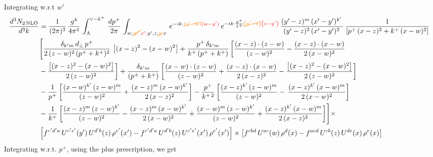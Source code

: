 \documentclass[9pt]{article}
\numberwithin{equation}{section}
\begin{document}
Integrating w.r.t $w'$
\begin{align}
 \frac{d^{3}N_{2\,\rm NLO}}{d^{3}k} & =  \frac{1}{(2\pi)^{3}}\,\frac{g^{4}}{4\pi^{4}}\,\int_{\Lambda}^{\vee-k^{+}}\, \frac{dp^{+}}{2\pi}\,\int_{w,{\color{orange}\cancel{w',}}{\color{red}x',}y',z,{\color{orange}\cancel{y,}}x}\, e^{-ik\cdot {\color{orange}\cancel{(y'-w)}}{\color{red}(w-y')}}\,e^{-ik\cdot \frac{p^{+}}{k^{+}}{\color{orange}\cancel{\left(y'-z\right)}}{\color{red}\left(z-y'\right)}}\, \frac{(y'-z)^{m}\,(x'-y')^{k'}\,}{(y'-z)^{2}\,(x'-y')^{2}\,}\, \frac{1}{\left[p^{+}\,(x-z)^{2}+k^{+}\,(x-w)^{2}\right]}\notag \\ & \Bigg[\frac{\delta_{k'm}\,d_{\perp}\,p^{+}}{2\,(z-w)^{2}\,(p^{+}+k^{+})^{2}}\, \left[(x-z)^{2}-(x-w)^{2}\right]+\frac{p^{+}\,\delta_{k'm}}{k^{+}\,(p^{+}+k^{+})}\,\bigg[\frac{(x-z)\cdot (z-w)}{(z-w)^{2}} -\frac{(x-z)\cdot (x-w)}{2\,(x-w)^{2}}\notag \\ & -\frac{\left[(x-z)^{2}-(x-w)^{2}\right]}{2\,(z-w)^{2}}\bigg] +\frac{\delta_{k'm}}{(p^{+}+k^{+})}\,\bigg[\frac{(x-w)\cdot (z-w)}{(z-w)^{2}}+\frac{(x-z)\cdot (x-w)}{2\,(x-z)^{2}} -\frac{\left[(x-z)^{2}-(x-w)^{2}\right]}{2\,(z-w)^{2}}\bigg]\notag \\ & -\frac{1}{p^{+}}\,\bigg[\frac{(x-w)^{k'}\,(z-w)^{m}}{(z-w)^{2}}+\frac{(x-z)^{m}\,(x-w)^{k'}}{2\,(x-z)^{2}}\bigg]-\frac{p^{+}}{k^{+\,2}}\,\bigg[\frac{(x-z)^{k'}\,(z-w)^{m}}{(z-w)^{2}} -\,\frac{(x-z)^{k'}\,(x-w)^{m}}{2\,(x-w)^{2}}\bigg]\notag \\ & -\frac{1}{k^{+}}\,\bigg[\frac{(x-z)^{m}\,(z-w)^{k'}}{(z-w)^{2}}-\frac{(x-z)^{m}\,(x-w)^{k'}}{2\,(x-w)^{2}}+\frac{(x-w)^{m}\,(z-w)^{k'}}{(z-w)^{2}} +\frac{(x-z)^{k'}\,(x-w)^{m}}{2\,(x-z)^{2}}\bigg]\Bigg]\times\,\notag \\ & \left[f^{c'd'a}\,U^{c'e'}(y')\,U^{d'b}(z)\,\rho^{e'}(x')-f^{c'd'a}\, 
    U^{d'b}(z)\,U^{c'e'}(x')\,\rho^{e'}(x')\right]\times \left[f^{cbd}\,U^{ac}(w)\,\rho^{d}(x) -f^{acd}\,U^{cb}(z)\,U^{de}(x)\,\rho^{e}(x)\right]
\end{align}
Integrating w.r.t. $p^{+}$, using the plus prescription, we get
\end{document}
